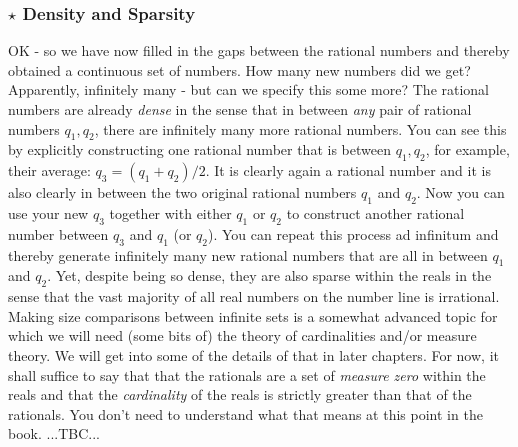 

\subsubsection{$\star$ Density and Sparsity}
OK - so we have now filled in the gaps between the rational numbers and thereby obtained a continuous set of numbers. How many new numbers did we get? Apparently, infinitely many - but can we specify this some more? The rational numbers are already \emph{dense} in the sense that in between \emph{any} pair of rational numbers $q_1, q_2$, there are infinitely many more  rational numbers. You can see this by explicitly constructing one rational number that is between $q_1, q_2$, for example, their average: $q_3 = (q_1 + q_2) / 2$. It is clearly again a rational number and it is also clearly in between the two original rational numbers $q_1$ and $q_2$. Now you can use your new $q_3$ together with either $q_1$ or $q_2$ to construct another rational number between $q_3$ and $q_1$ (or $q_2$). You can repeat this process ad infinitum and thereby generate infinitely many new rational numbers that are all in between $q_1$ and $q_2$. Yet, despite being so dense, they are also sparse within the reals in the sense that the vast majority of all  real numbers on the number line is irrational. Making size comparisons between infinite sets is a somewhat advanced topic for which we will need (some bits of) the theory of cardinalities and/or measure theory. We will get into some of the details of that in later chapters. For now, it shall suffice to say that that the rationals are a set of \emph{measure zero} within the reals and that the \emph{cardinality} of the reals is strictly greater than that of the rationals. You don't need to understand what that means at this point in the book. ...TBC...





